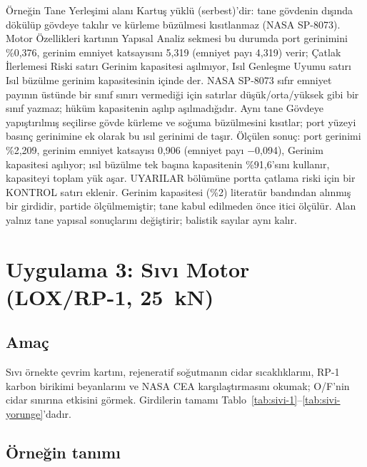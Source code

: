 \documentclass[11pt,a4paper]{article}
\newcommand{\ui}[1]{\textsf{#1}}
\begin{document}
Örneğin \ui{Tane Yerleşimi} alanı \ui{Kartuş yüklü (serbest)}'dir: tane gövdenin
dışında dökülüp gövdeye takılır ve kürleme büzülmesi kısıtlanmaz (NASA SP-8073).
\ui{Motor Özellikleri} kartının \ui{Yapısal Analiz} sekmesi bu durumda port
gerinimini \%0,376, gerinim emniyet katsayısını 5,319 (emniyet payı 4,319)
verir; \ui{Çatlak İlerlemesi Riski} satırı \ui{Gerinim kapasitesi
aşılmıyor}, \ui{Isıl Genleşme Uyumu} satırı \ui{Isıl büzülme gerinim
kapasitesinin içinde} der. NASA SP-8073 sıfır emniyet payının üstünde bir
sınıf sınırı vermediği için satırlar düşük/orta/yüksek gibi bir sınıf
yazmaz; hüküm kapasitenin aşılıp aşılmadığıdır. Aynı tane \ui{Gövdeye
yapıştırılmış} seçilirse gövde kürleme ve soğuma büzülmesini kısıtlar; port
yüzeyi basınç gerinimine ek olarak bu ısıl gerinimi de taşır. Ölçülen sonuç:
port gerinimi \%2,209, gerinim emniyet katsayısı 0,906 (emniyet payı
$-$0,094), \ui{Gerinim kapasitesi aşılıyor}; ısıl büzülme tek başına
kapasitenin \%91,6'sını kullanır, kapasiteyi toplam yük aşar. \ui{UYARILAR}
bölümüne portta çatlama riski için bir \ui{KONTROL} satırı eklenir. Gerinim
kapasitesi (\%2) literatür bandından alınmış bir girdidir, partide ölçülmemiştir;
tane kabul edilmeden önce itici ölçülür. Alan yalnız tane yapısal sonuçlarını
değiştirir; balistik sayılar aynı kalır.

\section{Uygulama 3: Sıvı Motor (LOX/RP-1, 25~kN)}\label{sec:uyg-sivi}

\subsection{Amaç}

Sıvı örnekte çevrim kartını, rejeneratif soğutmanın cidar sıcaklıklarını, RP-1
karbon birikimi beyanlarını ve NASA CEA karşılaştırmasını okumak; O/F'nin cidar
sınırına etkisini görmek. Girdilerin tamamı
Tablo~\ref{tab:sivi-1}--\ref{tab:sivi-yorunge}'dadır.

\subsection{Örneğin tanımı}
\end{document}
